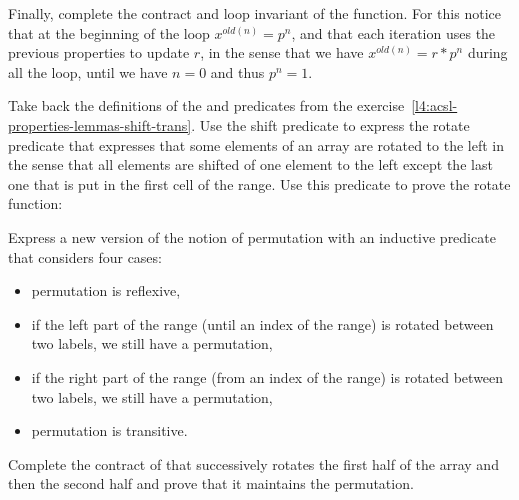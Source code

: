 Finally, complete the contract and loop invariant of the 
function. For this notice that at the beginning of the loop $x^{old(n)} = p^n$,
and that each iteration uses the previous properties to update $r$, in the sense
that we have $x^{old(n)} = r * p^n$ during all the loop, until we have $n = 0$ and
thus $p^n = 1$.




Take back the definitions of the  and 
predicates from the exercise~\ref{l4:acsl-properties-lemmas-shift-trans}. Use the
shift predicate to express the rotate predicate that expresses that some elements
of an array are rotated to the left in the sense that all elements are shifted of
one element to the left except the last one that is put in the first cell of the
range. Use this predicate to prove the rotate function:




Express a new version of the notion of permutation with an inductive predicate
that considers four cases:

\begin{itemize}
\item permutation is reflexive,
\item if the left part of the range (until an index of the range) is rotated
  between two labels, we still have a permutation,
\item if the right part of the range (from an index of the range) is rotated
  between two labels, we still have a permutation,
\item permutation is transitive.
\end{itemize}




Complete the contract of  that successively rotates the
first half of the array and then the second half and prove that it maintains the
permutation.


